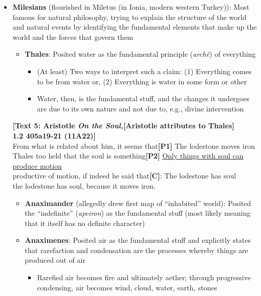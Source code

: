 \documentclass[11pt]{article}
\begin{document}
\begin{itemize}\item{\textbf{Milesians} (flourished in Miletus (in Ionia, modern western Turkey)): Most famous for natural philosophy, trying to explain the structure of the world and natural events by identifying the fundamental elements that make up the world and the forces that govern them}

\begin{itemize}

\item{\textbf{Thales}: Posited water as the fundamental principle (\emph{arch\^{e}}) of everything}\begin{itemize}\item{(At least) Two ways to interpret such a claim: (1) Everything comes to be from water or, (2) Everything is water in some form or other}\item{Water, then, is the fundamental stuff, and the changes it undergoes are due to its own nature and not due to, e.g., divine intervention}\end{itemize}\end{itemize}

\noindent\textbf{[Text 5: Aristotle \emph{On the Soul,}}\hspace*{35mm}\textbf{[Aristotle attributes to Thales]}\\\textbf{1.2 405a19-21 (11A22)]}\\From what is related about him, it seems that\hspace*{8.5mm}\textbf{[P1]} The lodestone moves iron\\Thales too held that the soul is something\hspace*{14mm}\textbf{[P2]} \underline{Only things with soul can produce motion} \\productive of motion, if indeed he said that\hspace*{11.5mm}\textbf{[C]}: The lodestone has soul\\the lodestone has soul, because it moves iron.

\begin{itemize}

\item{\textbf{Anaximander} (allegedly drew first map of ``inhabited'' world): Posited the ``indefinite'' (\emph{apeiron}) as the fundamental stuff (most likely meaning that it itself has no definite character)}

\item{\textbf{Anaximenes}: Posited air as the fundamental stuff and explicitly states that rarefaction and condensation are the processes whereby things are produced out of air}\begin{itemize}\item{Rarefied air becomes fire and ultimately aether; through progressive condensing, air becomes wind, cloud, water, earth, stones}\end{itemize}\end{itemize}


\end{itemize}
\end{document}
